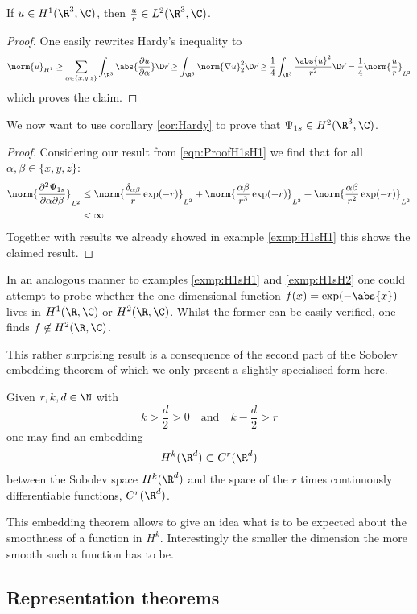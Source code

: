 \begin{cor}
	\label{cor:Hardy}
	If $u \in H^1(\R^3, \C)$, then $\frac{u}{r} \in L^2(\R^3, \C)$.
	\begin{proof}
		One easily rewrites Hardy's inequality to
		\[
			\norm{u}_{H^1} \geq  \sum_{\alpha\in\{x,y,z\}} \int_{\R^3} \abs{\frac{\partial u}{\partial \alpha}} \D\vec{r}
			\geq \int_{\R^3} \norm{\nabla u}_2^2 \D\vec{r}
			\geq \frac{1}{4} \int_{\R^3} \frac{\abs{u}^2}{r^2} \D\vec{r}
			= \frac{1}{4} \norm{\frac{u}{r}}_{L^2}
		\]
		which proves the claim.
	\end{proof}
\end{cor}

\begin{exmp}
	\label{exmp:H1sH2}
	We now want to use corollary \vref{cor:Hardy} to prove that
	$\Psi_{1s} \in H^2(\R^3,\C)$.
	\begin{proof}
		Considering our result from \eqref{eqn:ProofH1sH1}
		we find that for all $\alpha, \beta \in \{x,y,z\}$:
		\begin{align*}
			\norm{\frac{\partial^2 \Psi_{1s}}{\partial \alpha \partial \beta}}_{L^2}
			&\leq \norm{ \frac{\delta_{\alpha\beta}}{r} \exp(-r)}_{L^2}
			+ \norm{\frac{\alpha\beta}{r^3}\exp(-r)}_{L^2}
			+ \norm{\frac{\alpha\beta}{r^2}\exp(-r)}_{L^2} \\
			&< \infty
		\end{align*}
		Together with results we already showed in example \vref{exmp:H1sH1}
		this shows the claimed result.
\end{proof}
\end{exmp}

\begin{exmp}
	In an analogous manner to examples \vref{exmp:H1sH1} and \vref{exmp:H1sH2}
	one could attempt to probe whether the one-dimensional function
	$f(x) = \exp(-\abs{x})$ lives in $H^1(\R,\C)$ or $H^2(\R,\C)$.
	Whilst the former can be easily verified,
	one finds $f \not\in H^2(\R,\C)$.
\end{exmp}

This rather surprising result is a consequence of the second part of
the Sobolev embedding theorem
of which we only present a slightly specialised form  here.
\begin{thm}
	Given $r, k, d \in \N$ with
	\[ k > \frac{d}{2} > 0 \quad \text{and} \quad k -\frac{d}{2} > r \]
	one may find an embedding
	\[ H^k(\R^d) \subset C^r(\R^d) \]
	between the Sobolev space $H^k(\R^d)$ and the space of the $r$ times
	continuously differentiable functions, $C^r(\R^d)$.
\end{thm}
This embedding theorem allows to give an idea what is to be expected about
the smoothness of a function in $H^k$.
Interestingly the smaller the dimension the more smooth such a function
has to be.

\subsection{Representation theorems}
